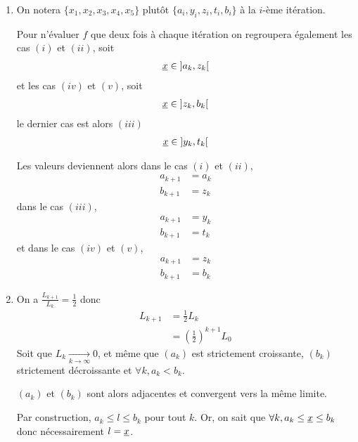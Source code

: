 \documentclass[french,a4paper,10pt]{article}
\begin{document}
	\begin{td-sol}
		\begin{enumerate}
			\item On notera $\{x_1, x_2, x_3, x_4, x_5\}$ plutôt $\{a_i, y_i, z_i, t_i, b_i\}$ à la $i$-ème itération. 
				
				Pour n'évaluer $f$ que deux fois à chaque itération on regroupera également les cas $(i)$ et $(ii)$, soit
				\[\begin{aligned}
					\underline{x} \in\mathopen{]}a_k, z_k\mathclose{[}
				\end{aligned}\]
				et les cas $(iv)$ et $(v)$, soit
				\[\begin{aligned}
					\underline{x}\in\mathopen{]}z_k,b_k\mathclose{[}
				\end{aligned}\]
				le dernier cas est alors $(iii)$
				\[\begin{aligned}
					\underline{x}\in\mathopen{]}y_k,t_k\mathclose{[}
				\end{aligned}\]
				
				Les valeurs deviennent alors dans le cas $(i)$ et $(ii)$,
				\[\begin{aligned}
					a_{k+1}&=a_k\\
					b_{k+1}&=z_k
				\end{aligned}\]
				dans le cas $(iii)$,
				\[\begin{aligned}
					a_{k+1}&=y_k\\
					b_{k+1}&=t_k
				\end{aligned}\]
				et dans le cas $(iv)$ et $(v)$,
				\[\begin{aligned}
					a_{k+1}&=z_k\\
					b_{k+1}&= b_k
				\end{aligned}\]
			
			\item On a $\frac{L_{k+1}}{L_k}=\frac12$ donc
				\[\begin{aligned}
					L_{k+1}&=\frac12L_k\\
					&=\left(\frac12\right)^{k+1}L_0
				\end{aligned}\]
			Soit que $L_k\underset{k\to\infty}\to 0$, et même que $(a_k)$ est strictement croissante, $(b_k)$ strictement décroissante et $\forall k,a_k<b_k$.
			
			$(a_k)$ et $(b_k)$ sont alors adjacentes et convergent vers la même limite.
			
			Par construction, $a_k\le l\le b_k$ pour tout $k$. Or, on sait que $\forall k,a_k\le \underline{x}\le b_k$ donc nécessairement $l=\underline{x}$.
		\end{enumerate}
	\end{td-sol}
	\medspace
	
\end{document}
